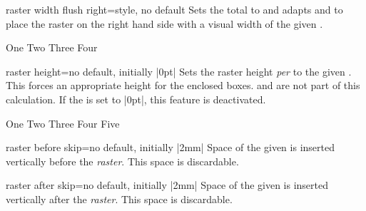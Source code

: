 \begin{docTcbKey}[][doc new=2018-11-30]{raster width flush right}{=}{style, no default}
  Sets the total  to  and adapts
   and  to
  place the raster on the right hand side
  with a visual width of the given .
\begin{dispExample}
\begin{tcbitemize}[raster width flush right=\linewidth/2,
  size=small,colframe=red!50!black,colback=red!10!white]
  \tcbitem One
  \tcbitem Two
  \tcbitem Three
  \tcbitem Four
\end{tcbitemize}
\end{dispExample}
\end{docTcbKey}


\clearpage
\begin{docTcbKey}[][doc new=2014-11-10]{raster height}{=}{no default, initially |0pt|}
  Sets the raster height \emph{per}  to the given .
  This forces an appropriate height for the enclosed boxes.
   and 
  are not part of this calculation.
  If the  is set to |0pt|, this feature is deactivated.
\begin{dispExample}
\begin{tcbitemize}[raster height=4cm, raster rows=2,
  size=small,colframe=red!50!black,colback=red!10!white]
  \tcbitem One
  \tcbitem Two
  \tcbitem[enhanced,
    finish={\draw[blue,very thick,<->] (frame.south)
      -- node[right,pos=.75]{4cm} +(0,4); }]
    Three
  \tcbitem Four
  \tcbitem Five
\end{tcbitemize}
\end{dispExample}
\end{docTcbKey}


\begin{docTcbKey}[][doc new and updated={2014-11-10}{2014-12-16}]{raster before skip}{=}{no default, initially |2mm|}
  Space of the given  is inserted vertically before the \emph{raster}.
  This space is discardable.
\end{docTcbKey}

\begin{docTcbKey}[][doc new and updated={2014-11-10}{2014-12-16}]{raster after skip}{=}{no default, initially |2mm|}
  Space of the given  is inserted vertically after the \emph{raster}.
  This space is discardable.
\end{docTcbKey}


